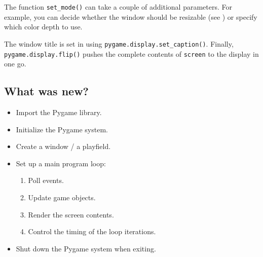 
The function \texttt{set\_mode()} can take a couple of additional parameters. For example, you can decide whether the window should be resizable (see ) or specify which color depth to use.

The window title is set in  using \texttt{pygame.display.set\_caption()}. Finally, \texttt{pygame\-.dis\-play.flip()} pushes the complete contents of \texttt{screen} to the display in one go.

\subsection{What was new?}

\begin{hintbox}

\begin{itemize}
	\item Import the Pygame library.
	\item Initialize the Pygame system.
	\item Create a window / a playfield.
	\item Set up a main program loop:
	\begin{enumerate}
		\item Poll events.
		\item Update game objects.
		\item Render the screen contents.
		\item Control the timing of the loop iterations.
	\end{enumerate}
	\item Shut down the Pygame system when exiting.
\end{itemize}
\end{hintbox}

